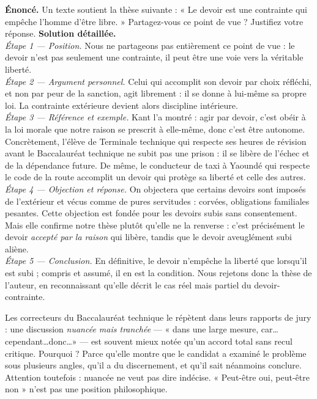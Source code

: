 \documentclass[11pt]{article}
\begin{document}
\begin{exoresolu}
\textbf{Énoncé.} Un texte soutient la thèse suivante : « Le devoir est une contrainte qui empêche l'homme d'être libre. » Partagez-vous ce point de vue ? Justifiez votre réponse.
\tcblower
\textbf{Solution détaillée.}\\
\emph{Étape 1 — Position.} Nous ne partageons pas entièrement ce point de vue : le devoir n'est pas seulement une contrainte, il peut être une voie vers la véritable liberté.\\
\emph{Étape 2 — Argument personnel.} Celui qui accomplit son devoir par choix réfléchi, et non par peur de la sanction, agit librement : il se donne à lui-même sa propre loi. La contrainte extérieure devient alors discipline intérieure.\\
\emph{Étape 3 — Référence et exemple.} Kant l'a montré : agir par devoir, c'est obéir à la loi morale que notre raison se prescrit à elle-même, donc c'est être autonome. Concrètement, l'élève de Terminale technique qui respecte ses heures de révision avant le Baccalauréat technique ne subit pas une prison : il se libère de l'échec et de la dépendance future. De même, le conducteur de taxi à Yaoundé qui respecte le code de la route accomplit un devoir qui protège sa liberté et celle des autres.\\
\emph{Étape 4 — Objection et réponse.} On objectera que certains devoirs sont imposés de l'extérieur et vécus comme de pures servitudes : corvées, obligations familiales pesantes. Cette objection est fondée pour les devoirs subis sans consentement. Mais elle confirme notre thèse plutôt qu'elle ne la renverse : c'est précisément le devoir \emph{accepté par la raison} qui libère, tandis que le devoir aveuglément subi aliène.\\
\emph{Étape 5 — Conclusion.} En définitive, le devoir n'empêche la liberté que lorsqu'il est subi ; compris et assumé, il en est la condition. Nous rejetons donc la thèse de l'auteur, en reconnaissant qu'elle décrit le cas réel mais partiel du devoir-contrainte.
\end{exoresolu}

\begin{savaistu}
Les correcteurs du Baccalauréat technique le répètent dans leurs rapports de jury : une discussion \emph{nuancée mais tranchée} — « dans une large mesure, car\ldots cependant\ldots donc\ldots » — est souvent mieux notée qu'un accord total sans recul critique. Pourquoi ? Parce qu'elle montre que le candidat a examiné le problème sous plusieurs angles, qu'il a du discernement, et qu'il sait néanmoins conclure. Attention toutefois : nuancée ne veut pas dire indécise. « Peut-être oui, peut-être non » n'est pas une position philosophique.
\end{savaistu}
\end{document}
